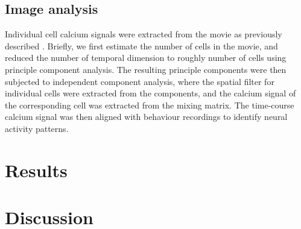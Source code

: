\subsection{Image analysis}
Individual cell calcium signals were extracted from the movie as previously described \citep{mukamel09}. Briefly, we first estimate the number of cells in the movie, and reduced the number of temporal dimension to roughly number of cells using principle component analysis. The resulting principle components were then subjected to independent component analysis, where the spatial filter for individual cells were extracted from the components, and the calcium signal of the corresponding cell was extracted from the mixing matrix. The time-course calcium signal was then aligned with behaviour recordings to identify neural activity patterns.


\section{Results}
\section{Discussion}
